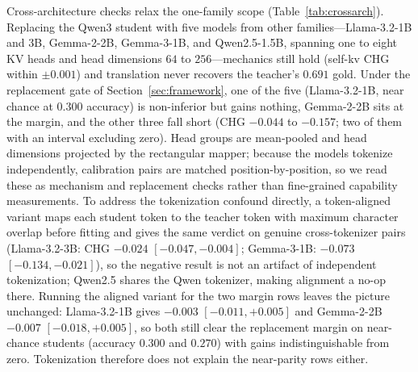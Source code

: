 \documentclass[10pt]{article}
\begin{document}
Cross-architecture checks relax the one-family scope
(Table~\ref{tab:crossarch}). Replacing the Qwen3 student with five models from
other families---Llama-3.2-1B and 3B, Gemma-2-2B, Gemma-3-1B, and
Qwen2.5-1.5B, spanning one to eight KV heads and head dimensions $64$ to
$256$---mechanics still hold (self-kv CHG within $\pm0.001$) and translation
never recovers the teacher's $0.691$ gold. Under the replacement gate of
Section~\ref{sec:framework}, one of the five (Llama-3.2-1B, near chance at
$0.300$ accuracy) is non-inferior but gains nothing, Gemma-2-2B sits at the
margin, and the other three fall short (CHG $-0.044$ to $-0.157$; two of them
with an interval excluding zero). Head groups are mean-pooled and head
dimensions projected by the rectangular mapper; because the models tokenize
independently, calibration pairs are matched position-by-position, so we read
these as mechanism and replacement checks rather than fine-grained capability
measurements. To address the tokenization confound directly, a token-aligned
variant maps each student token to the teacher token with maximum character
overlap before fitting and gives the same verdict on genuine cross-tokenizer
pairs (Llama-3.2-3B: CHG $-0.024$ $[-0.047,-0.004]$; Gemma-3-1B: $-0.073$
$[-0.134,-0.021]$), so the negative result is not an artifact of independent
tokenization; Qwen2.5 shares the Qwen tokenizer, making alignment a no-op
there. Running the aligned variant for the two margin rows leaves the picture
unchanged: Llama-3.2-1B gives $-0.003$ $[-0.011,+0.005]$ and Gemma-2-2B
$-0.007$ $[-0.018,+0.005]$, so both still clear the replacement margin on
near-chance students (accuracy $0.300$ and $0.270$) with gains indistinguishable
from zero. Tokenization therefore does not explain the near-parity rows either.
\end{document}
